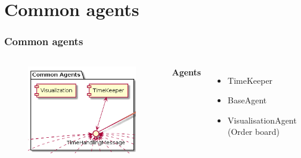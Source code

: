 \documentclass{beamer}
\begin{document}
\section{Common agents}%
\label{sec:common_agents}
\begin{frame}
    \frametitle{\huge{Common agents}}
    \begin{columns}[t]
        \begin{figure}[H]
            \centering
            \includegraphics[width=0.75\linewidth]{common_component_diagram.png}
        \end{figure}
            \textbf{Agents}
            \begin{itemize}
                \item TimeKeeper
                \item BaseAgent
                \item VisualisationAgent (Order board)
            \end{itemize}
    \end{columns}
\end{frame}
\end{document}
